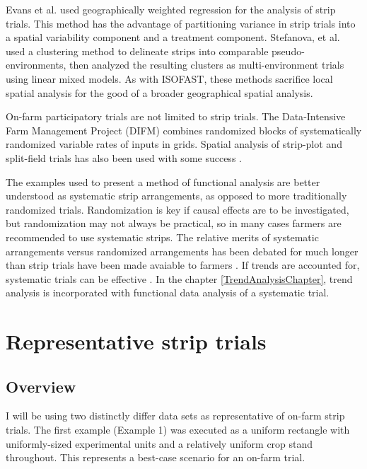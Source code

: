 \documentclass[phdcss]{SDSUThesis}
\begin{document}
Evans et al. \cite{evans-11-2020} used geographically weighted regression for the analysis of strip trials. This method has the advantage of partitioning variance in strip trials into a spatial variability component and a treatment component. Stefanova, et al. \cite{stefanova-04-2023} used a clustering method to delineate strips into comparable pseudo-environments, then analyzed the resulting clusters as multi-environment trials using linear mixed models. As with ISOFAST, these methods sacrifice local spatial analysis for the good of a broader geographical spatial analysis.

On-farm participatory trials are not limited to strip trials. The Data‐Intensive Farm Management Project (DIFM) \cite{bullock-11-2019} combines randomized blocks of systematically randomized variable rates of inputs in grids. Spatial analysis of strip-plot and split-field trials has also been used with some success \cite{griffin-08-2008}. 


The examples used to present a method of functional analysis are better understood as systematic strip arrangements, as opposed to more traditionally randomized trials. Randomization is key if causal effects are to be investigated, but randomization may not always be practical, so in many cases farmers are recommended to use systematic strips. The relative merits of systematic arrangements versus randomized arrangements has been debated for much longer than strip trials have been made avaiable to farmers \cite{yates-01-1939}. If trends are accounted for, systematic trials can be effective \cite{alesso-11-2019, cao-06-2022}. In the chapter \ref{TrendAnalysisChapter}, trend analysis is incorporated with functional data analysis of a systematic trial.

\clearpage

\chapter{Representative strip trials}\label{RepresentativeStripTrialsChapter}

\section{Overview}

I will be using two distinctly differ data sets as representative of on-farm strip trials. The first example (Example 1) was executed as a uniform rectangle with uniformly-sized experimental units and a relatively uniform crop stand throughout. This represents a best-case scenario for an on-farm trial. 
\end{document}

